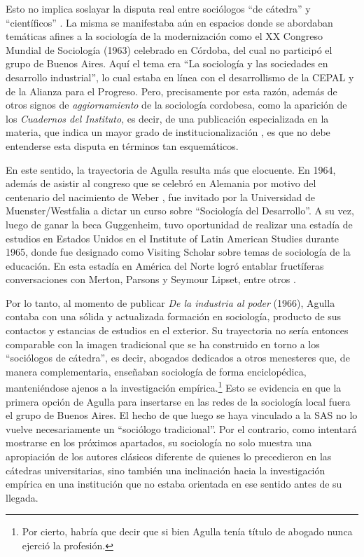 Esto no implica soslayar la disputa real entre sociólogos \enquote{de cátedra} y \enquote{científicos} \parencite{1567-BLANCO2004}. La misma se manifestaba aún en espacios donde se abordaban temáticas afines a la sociología de la modernización como el XX Congreso Mundial de Sociología (1963) celebrado en Córdoba, del cual no participó el grupo de Buenos Aires. Aquí el tema era \enquote{La sociología y las sociedades en desarrollo industrial}, lo cual estaba en línea con el desarrollismo de la CEPAL y de la Alianza para el Progreso. Pero, precisamente por esta razón, además de otros signos de \emph{aggiornamiento} de la sociología cordobesa, como la aparición de los \emph{Cuadernos del Instituto}, es decir, de una publicación especializada en la materia, que indica un mayor grado de institucionalización \parencite{1512-SHILS1971}, es que no debe entenderse esta disputa en términos tan esquemáticos.

En este sentido, la trayectoria de Agulla resulta más que elocuente. En 1964, además de asistir al congreso que se celebró en Alemania por motivo del centenario del nacimiento de Weber \parencite{1635-AGULLA1964}, fue invitado por la Universidad de Muenster/Westfalia a dictar un curso sobre \enquote{Sociología del Desarrollo}. A su vez, luego de ganar la beca Guggenheim, tuvo oportunidad de realizar una estadía de estudios en Estados Unidos en el Institute of Latin American Studies durante 1965, donde fue designado como Visiting Scholar sobre temas de sociología de la educación. En esta estadía en América del Norte logró entablar fructíferas conversaciones con Merton, Parsons y Seymour Lipset, entre otros \parencite{1634-AGULLA1997}.

Por lo tanto, al momento de publicar \emph{De la industria al poder} (1966), Agulla contaba con una sólida y actualizada formación en sociología, producto de sus contactos y estancias de estudios en el exterior. Su trayectoria no sería entonces comparable con la imagen tradicional que se ha construido en torno a los \enquote{sociólogos de cátedra}, es decir, abogados dedicados a otros menesteres que, de manera complementaria, enseñaban sociología de forma enciclopédica, manteniéndose ajenos a la investigación empírica.\footnote{Por cierto, habría que decir que si bien Agulla tenía título de abogado nunca ejerció la profesión.} Esto se evidencia en que la primera opción de Agulla para insertarse en las redes de la sociología local fuera el grupo de Buenos Aires. El hecho de que luego se haya vinculado a la SAS no lo vuelve necesariamente un \enquote{sociólogo tradicional}. Por el contrario, como intentará mostrarse en los próximos apartados, su sociología no solo muestra una apropiación de los autores clásicos diferente de quienes lo precedieron en las cátedras universitarias, sino también una inclinación hacia la investigación empírica en una institución que no estaba orientada en ese sentido antes de su llegada.

